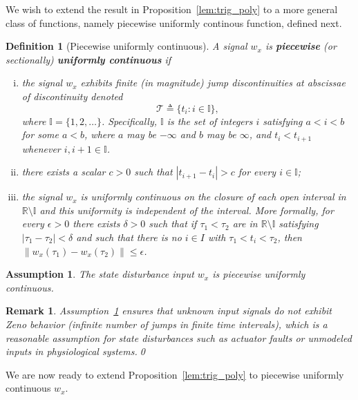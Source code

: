 \documentclass[times, doublespace]{rncauth}
\newtheorem{definition}{Definition}
\newtheorem{assumption}{Assumption}
\newtheorem{remark}{Remark}
\begin{document}
We wish to extend the result in Proposition~\ref{lem:trig_poly} to a more general class of functions, namely piecewise uniformly continous function, defined next.
\begin{definition}[Piecewise uniformly continuous]
	\label{def:pw_cont}
	A signal $w_x$ is \textbf{piecewise} (or sectionally) \textbf{uniformly continuous} if
	\begin{enumerate}[(i)]
		\item the signal $w_x$ exhibits finite (in magnitude) jump discontinuities at abscissae of discontinuity denoted $$\mathcal T \triangleq \{t_i: i\in\mathbb{I}\},$$ where $\mathbb{I}=\{1, 2,\ldots\}$. Specifically, $\mathbb I$ is the set of integers $i$ satisfying $a < i < b$ for some $a < b$, where $a$ may be $-\infty$ and $b$ may be $\infty$, and $t_i < t_{i+1}$ whenever $i, i+1 \in \mathbb I$.
		\item there exists a scalar $c>0$ such that $|t_{i+1} - t_i|>c$
		for every $i \in\mathbb{I}$;
		\item the signal $w_x$ is uniformly continuous on the closure of each open interval in $\mathbb R \setminus \mathbb I$ and this uniformity is independent of the interval.  More formally, for every $\epsilon > 0$ there exists $\delta > 0$ such that if $\tau_1 < \tau_2$ are in $\mathbb R \setminus \mathbb I$ satisfying $|\tau_1-\tau_2|< \delta$ and such that there is no $i \in I$ with $\tau_1 < t_i < \tau_2$, then $\|w_x(\tau_1) - w_x(\tau_2)\| \leq \epsilon$.
	\end{enumerate}
\end{definition}
\begin{assumption}\label{ass:unif_cont_uio}
	The state disturbance input $w_x$ is piecewise uniformly continuous.
\end{assumption}
\begin{remark}
	Assumption~\ref{ass:unif_cont_uio} ensures that unknown input signals do not exhibit Zeno behavior (infinite number of jumps in finite time intervals), which is a reasonable assumption for state disturbances such as actuator faults or unmodeled inputs in physiological systems.\qed
	\end{remark}

We are now ready to extend Proposition~\ref{lem:trig_poly} to piecewise uniformly continuous $w_x$.
\end{document}
